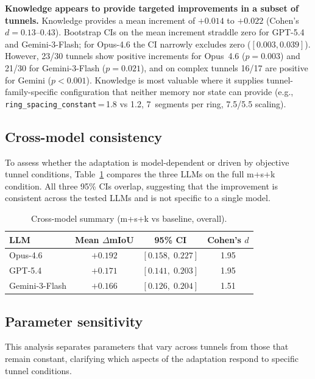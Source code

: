 \documentclass[a4paper,fleqn]{cas-dc}
\begin{document}
\textbf{Knowledge appears to provide targeted improvements in a subset of tunnels.} Knowledge provides a mean increment of $+0.014$ to $+0.022$ (Cohen's $d = 0.13$--$0.43$). Bootstrap CIs on the mean increment straddle zero for GPT-5.4 and Gemini-3-Flash; for Opus-4.6 the CI narrowly excludes zero ($[0.003, 0.039]$). However, 23/30 tunnels show positive increments for Opus~4.6 ($p = 0.003$) and 21/30 for Gemini-3-Flash ($p = 0.021$), and on complex tunnels 16/17 are positive for Gemini ($p < 0.001$). Knowledge is most valuable where it supplies tunnel-family-specific configuration that neither memory nor state can provide (e.g., \texttt{ring\_spacing\_constant}\,=\,1.8 vs 1.2, 7~segments per ring, 7.5/5.5 scaling).

\subsection{Cross-model consistency}\label{sec:consistency}

To assess whether the adaptation is model-dependent or driven by objective tunnel conditions, Table~\ref{tab:cross-model} compares the three LLMs on the full m+s+k condition. All three 95\% CIs overlap, suggesting that the improvement is consistent across the tested LLMs and is not specific to a single model.

\begin{table}[ht]
\caption{Cross-model summary (m+s+k vs baseline, overall).}\label{tab:cross-model}
\begin{tabular*}{\tblwidth}{@{} l c c c @{}}
\toprule
LLM & Mean $\Delta$mIoU & 95\% CI & Cohen's $d$ \\
\midrule
Opus-4.6 & $+0.192$ & $[0.158,\; 0.227]$ & 1.95 \\
GPT-5.4 & $+0.171$ & $[0.141,\; 0.203]$ & 1.95 \\
Gemini-3-Flash & $+0.166$ & $[0.126,\; 0.204]$ & 1.51 \\
\bottomrule
\end{tabular*}
\end{table}

\subsection{Parameter sensitivity}\label{sec:sensitivity}

This analysis separates parameters that vary across tunnels from those that remain constant, clarifying which aspects of the adaptation respond to specific tunnel conditions.
\end{document}

